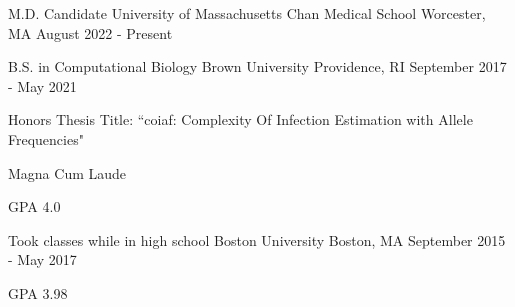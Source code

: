 
\begin{cventries}

  \cventry
    {M.D. Candidate} %
    {University of Massachusetts Chan Medical School} %
    {Worcester, MA} %
    {August 2022 - Present} %
    {}

  \cventry
    {B.S. in Computational Biology} %
    {Brown University} %
    {Providence, RI} %
    {September 2017 - May 2021} %
    {
      \begin{cvitems}
        \item{Honors Thesis Title: ``coiaf: Complexity Of Infection Estimation
        with Allele Frequencies"}
        \item {Magna Cum Laude}
        \item {GPA 4.0}
      \end{cvitems}
    }
  
  \cventry
    {Took classes while in high school} %
    {Boston University} %
    {Boston, MA} %
    {September 2015 - May 2017} %
    {
      \begin{cvitems}
        \item {GPA 3.98}
      \end{cvitems}
    }
    
\end{cventries}
